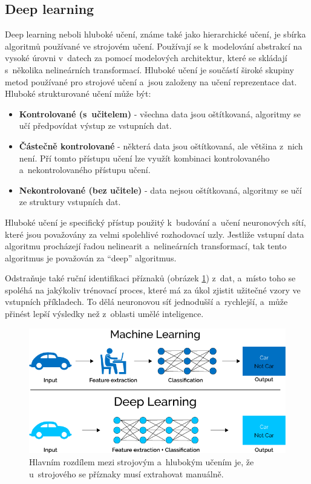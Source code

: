\subsection{Deep learning}
Deep learning neboli hluboké učení, známe také jako hierarchické učení, je sbírka algoritmů používané ve strojovém učení. Používají se k~modelování abstrakcí na vysoké úrovni v~datech za pomocí modelových architektur, které se skládají s~několika nelineárních transformací. Hluboké učení je součástí široké skupiny metod používané pro strojové učení a~jsou založeny na učení reprezentace dat. Hluboké strukturované učení může být:
\begin{itemize}
  \item{\textbf{Kontrolované (s~učitelem)} - všechna data jsou oštítkovaná, algoritmy se učí předpovídat výstup ze vstupních dat.}
  \item{\textbf{Částečně kontrolované} - některá data jsou oštítkovaná, ale většina z~nich není. Pří tomto přístupu učení lze využít kombinaci kontrolovaného a~nekontrolovaného přístupu učení.}
  \item{\textbf{Nekontrolované (bez učitele)} - data nejsou oštítkovaná, algoritmy se učí ze struktury vstupních dat.}
\end{itemize}
Hluboké učení je specifický přístup použitý k~budování a~učení neuronových sítí, které jsou považovány za velmi spolehlivé rozhodovací uzly. Jestliže vstupní data algoritmu procházejí řadou nelinearit a~nelineárních transformací, tak tento algoritmus je považován za ``deep'' algoritmus. 

Odstraňuje také ruční identifikaci příznaků (obrázek \ref{fig:ml_vs_ann}) z~dat, a~místo toho se spoléhá na jakýkoliv trénovací proces, které má za úkol zjistit užitečné vzory ve vstupních příkladech. To dělá neuronovou síť jednodušší a~rychlejší, a~může přinést lepší výsledky než z~oblasti umělé inteligence.

\begin{figure}[H]
\centering
\includegraphics[width=.85\linewidth]{figures/ml_vs_ann}
\caption{Hlavním rozdílem mezi strojovým a~hlubokým učením je, že u~strojového se příznaky musí extrahovat manuálně. \cite{fig:mlvsann}}
\label{fig:ml_vs_ann}
\end{figure}

